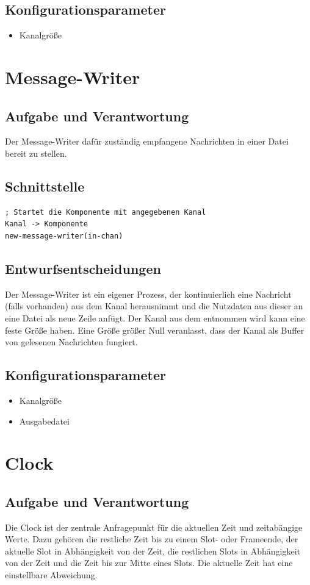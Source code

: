 \documentclass[draft=false
              ,paper=a4
              ,twoside=false
              ,fontsize=11pt
              ,headsepline
              ,BCOR10mm
              ,DIV11
              ]{scrbook}
\begin{document}
\subsection{Konfigurationsparameter}
\begin{itemize}
	\item Kanalgröße
\end{itemize}

\section{Message-Writer}
\subsection{Aufgabe und Verantwortung}
Der Message-Writer dafür zuständig empfangene Nachrichten in einer Datei bereit zu stellen.

\subsection{Schnittstelle}
\begin{lstlisting}
; Startet die Komponente mit angegebenen Kanal
Kanal -> Komponente
new-message-writer(in-chan)
\end{lstlisting}

\subsection{Entwurfsentscheidungen}
Der Message-Writer ist ein eigener Prozess, der kontinuierlich eine Nachricht (falls vorhanden) aus dem Kanal herausnimmt und die Nutzdaten aus dieser an eine Datei als neue Zeile anfügt. Der Kanal aus dem entnommen wird kann eine feste Größe haben. Eine Größe größer Null veranlasst, dass der Kanal als Buffer von gelesenen Nachrichten fungiert.

\subsection{Konfigurationsparameter}
\begin{itemize}
	\item Kanalgröße
	\item Ausgabedatei
\end{itemize}

\section{Clock}
\subsection{Aufgabe und Verantwortung}
Die Clock ist der zentrale Anfragepunkt für die aktuellen Zeit und zeitabängige Werte. Dazu gehören die restliche Zeit bis zu einem Slot- oder Frameende, der aktuelle Slot in Abhängigkeit von der Zeit, die restlichen Slots in Abhängigkeit von der Zeit und die Zeit bis zur Mitte eines Slots. Die aktuelle Zeit hat eine einstellbare Abweichung.
\end{document}
